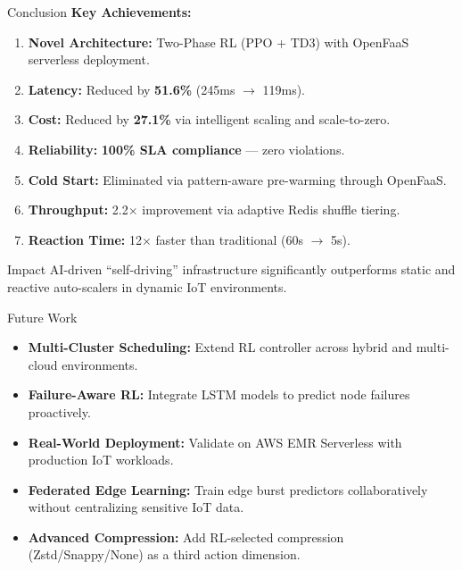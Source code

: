 \documentclass{beamer}
\begin{document}
\begin{frame}{Conclusion}
\textbf{Key Achievements:}
\begin{enumerate}
    \item \textbf{Novel Architecture:} Two-Phase RL (PPO + TD3) with OpenFaaS serverless deployment.
    \item \textbf{Latency:} Reduced by \textbf{51.6\%} (245ms $\rightarrow$ 119ms).
    \item \textbf{Cost:} Reduced by \textbf{27.1\%} via intelligent scaling and scale-to-zero.
    \item \textbf{Reliability:} \textbf{100\% SLA compliance} --- zero violations.
    \item \textbf{Cold Start:} Eliminated via pattern-aware pre-warming through OpenFaaS.
    \item \textbf{Throughput:} 2.2$\times$ improvement via adaptive Redis shuffle tiering.
    \item \textbf{Reaction Time:} 12$\times$ faster than traditional (60s $\rightarrow$ 5s).
\end{enumerate}
\vspace{0.2cm}
\begin{block}{Impact}
AI-driven ``self-driving'' infrastructure significantly outperforms static and reactive auto-scalers in dynamic IoT environments.
\end{block}
\end{frame}

\begin{frame}{Future Work}
\begin{itemize}
    \item \textbf{Multi-Cluster Scheduling:} Extend RL controller across hybrid and multi-cloud environments.
    \item \textbf{Failure-Aware RL:} Integrate LSTM models to predict node failures proactively.
    \item \textbf{Real-World Deployment:} Validate on AWS EMR Serverless with production IoT workloads.
    \item \textbf{Federated Edge Learning:} Train edge burst predictors collaboratively without centralizing sensitive IoT data.
    \item \textbf{Advanced Compression:} Add RL-selected compression (Zstd/Snappy/None) as a third action dimension.
\end{itemize}
\end{frame}

\end{document}
